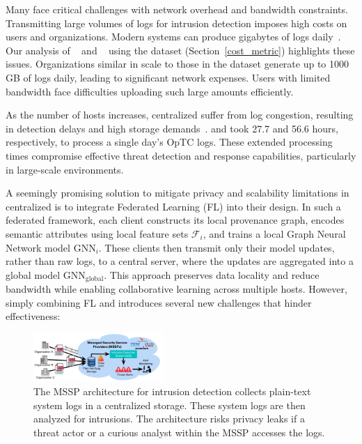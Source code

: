 Many \pids face critical challenges with network overhead and bandwidth constraints. Transmitting large volumes of logs for intrusion detection imposes high costs on users and organizations. Modern systems can produce gigabytes of logs daily~\cite{inam2023sok,hossain+depend}. Our analysis of \flash~\cite{flash2024} and \kairos~\cite{cheng2023kairos} using the \optc dataset (Section~\ref{cost_metric}) highlights these issues. Organizations similar in scale to those in the \optc dataset generate up to 1000 GB of logs daily, leading to significant network expenses. Users with limited bandwidth face difficulties uploading such large amounts efficiently.

As the number of hosts increases, centralized \pids suffer from log congestion, resulting in detection delays and high storage demands~\cite{dong2023distdet}. \flash and \kairos took 27.7 and 56.6 hours, respectively, to process a single day's OpTC logs. These extended processing times compromise effective threat detection and response capabilities, particularly in large-scale environments.



\smallskip
{}
\smallskip
{}

\noindent
A seemingly promising solution to mitigate privacy and scalability limitations in centralized \pids is to integrate Federated Learning (FL) into their design. In such a federated \pids framework, each client constructs its local provenance graph, encodes semantic attributes using local feature sets \( \mathcal{F}_i \), and trains a local Graph Neural Network model \( \text{GNN}_{i} \). These clients then transmit only their model updates, rather than raw logs, to a central server, where the updates are aggregated into a global model \( \text{GNN}_{\text{global}} \). This approach preserves data locality and reduce bandwidth while enabling collaborative learning across multiple hosts. However, simply combining FL and \pids introduces several new challenges that hinder effectiveness:

\begin{figure}[t!]
  \centering
  \includegraphics[width=0.44\textwidth]{fig/mssp.pdf}
  \caption{The MSSP architecture for intrusion detection collects plain-text system logs in a centralized storage. These system logs are then analyzed for intrusions. The architecture risks privacy leaks if a threat actor or a curious analyst within the MSSP accesses the logs.}
  \label{mssp}
  \vspace{-4ex}
\end{figure}


